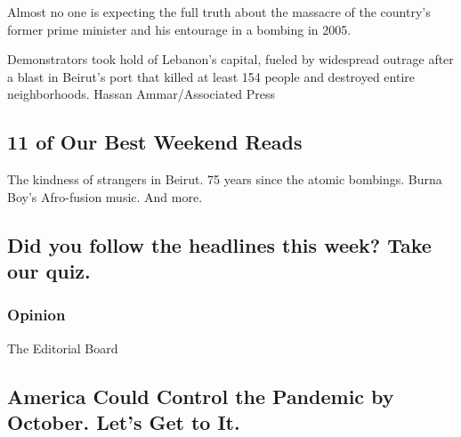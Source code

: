 Almost no one is expecting the full truth about the massacre of the
country's former prime minister and his entourage in a bombing in 2005.

Demonstrators took hold of Lebanon's capital, fueled by widespread
outrage after a blast in Beirut's port that killed at least 154 people
and destroyed entire neighborhoods. Hassan Ammar/Associated Press

\href{/2020/08/07/briefing/best-weekend-reads.html}{}

\hypertarget{11-of-our-best-weekend-reads}{%
\subsection{11 of Our Best Weekend
Reads}\label{11-of-our-best-weekend-reads}}

The kindness of strangers in Beirut. 75 years since the atomic bombings.
Burna Boy's Afro-fusion music. And more.

\href{/2020/08/07/briefing/best-weekend-reads.html}{}

\href{/interactive/2020/08/07/briefing/beirut-tiktok-census-bureau-news-quiz.html}{}

\hypertarget{did-you-follow-the-headlines-this-week-take-our-quiz}{%
\subsection{Did you follow the headlines this week? Take our
quiz.}\label{did-you-follow-the-headlines-this-week-take-our-quiz}}

\href{https://www.nytimes.com/section/opinion?pagetype=Homepage\&action=click\&module=Opinion}{}

\hypertarget{opinion}{%
\subsubsection{Opinion}\label{opinion}}

\href{/2020/08/08/opinion/sunday/coronavirus-response-testing-lockdown.html}{}

The Editorial Board

\hypertarget{america-could-control-the-pandemic-by-october-lets-get-to-it}{%
\subsection{America Could Control the Pandemic by October. Let's Get to
It.}\label{america-could-control-the-pandemic-by-october-lets-get-to-it}}

